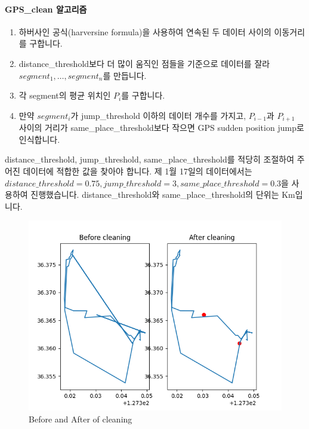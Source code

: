 \documentclass{oblivoir}
\begin{document}
  \paragraph{GPS\_clean 알고리즘}
  \begin{enumerate}
    \item 하버사인 공식(harversine formula)을 사용하여 연속된 두 데이터 사이의 이동거리를 구합니다.
    \item distance\_threshold보다 더 많이 움직인 점들을 기준으로 데이터를 잘라 $segment_1,\ldots,segment_n$를 만듭니다.
    \item 각 segment의 평균 위치인 $P_i$를 구합니다.
    \item 만약 $segment_i$가 jump\_threshold 이하의 데이터 개수를 가지고, $P_{i-1}$과 $P_{i+1}$ 사이의 거리가 same\_place\_threshold보다 작으면 GPS sudden position jump로 인식합니다.
  \end{enumerate}
  distance\_threshold, jump\_threshold, same\_place\_threshold를 적당히 조절하여 주어진 데이터에 적합한 값을 찾아야 합니다.
  제 1월 17일의 데이터에서는 $distance\_threshold=0.75,jump\_threshold=3,same\_place\_threshold=0.3$을 사용하여 진행했습니다.
  distance\_threshold와 same\_place\_threshold의 단위는 Km입니다. 
  \begin{figure}[H]
    \caption{Before and After of cleaning}
    \includegraphics[width=\textwidth]{GPS_preprocess_4.png}
  \end{figure}
\end{document}
